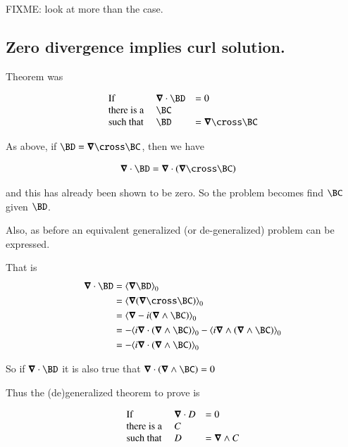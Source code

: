 FIXME: look at more than the  case.

\subsection{Zero divergence implies curl solution. }

Theorem was

\begin{equation*}
\begin{array}{l l l}
\text{If} &                 \spacegrad \cdot \BD &= 0 \\
\text{there is a } &                         \BC &    \\
\text{such that  } & \BD &= \spacegrad \cross \BC \\
\end{array} 
\end{equation*}

As above, if $\BD = \spacegrad \cross \BC$, then we have

\begin{align*}
\spacegrad \cdot \BD &= \spacegrad \cdot (\spacegrad \cross \BC)
\end{align*}

and this has already been shown to be zero.  So the problem becomes find $\BC$ given $\BD$.

Also, as before an equivalent generalized (or de-generalized) problem can be expressed.  

That is
\begin{align*}
\spacegrad \cdot \BD 
&= \gpgradezero{\spacegrad \BD} \\
&= \gpgradezero{\spacegrad (\spacegrad \cross \BC)} \\
&= \gpgradezero{\spacegrad -i (\spacegrad \wedge \BC)} \\
&= -\gpgradezero{i\spacegrad \cdot (\spacegrad \wedge \BC)} -\gpgradezero{i\spacegrad \wedge (\spacegrad \wedge \BC)} \\
&= -\gpgradezero{i\spacegrad \cdot (\spacegrad \wedge \BC)} \\
\end{align*}

So if $\spacegrad \cdot \BD$ it is also true that $\spacegrad \cdot (\spacegrad \wedge \BC) = 0$

Thus the (de)generalized theorem to prove is

\begin{equation*}
\begin{array}{l l l}
\text{If} &                 \boldsymbol{\nabla} \cdot D &= 0 \\
\text{there is a } &                       C &    \\
\text{such that  } & D &= \boldsymbol{\nabla} \wedge C \\
\end{array} 
\end{equation*}

